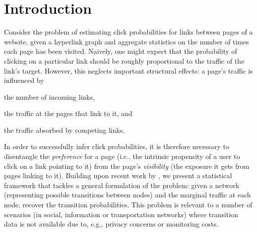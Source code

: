 \section{Introduction}  %
\label{cr:sec:intro}

Consider the problem of estimating click probabilities for links between pages of a website, given a hyperlink graph and aggregate statistics on the number of times each page has been visited.
Naively, one might expect that the probability of clicking on a particular link should be roughly proportional to the traffic of the link's target.
However, this neglects important structural effects:
a page's traffic is influenced by
\begin{enuminline}
\item the number of incoming links,
\item the traffic at the pages that link to it, and
\item the traffic absorbed by competing links.
\end{enuminline}
In order to successfully infer click probabilities, it is therefore necessary to disentangle the \emph{preference} for a page (i.e., the intrinsic propensity of a user to click on a link pointing to it) from the page's \emph{visibility} (the exposure it gets from pages linking to it).
Building upon recent work by \citet{kumar2015inverting}, we present a statistical framework that tackles a general formulation of the problem:
given a network (representing possible transitions between nodes) and the marginal traffic at each node, recover the transition probabilities.
This problem is relevant to a number of scenarios (in social, information or transportation networks) where transition data is not available due to, e.g., privacy concerns or monitoring costs.

